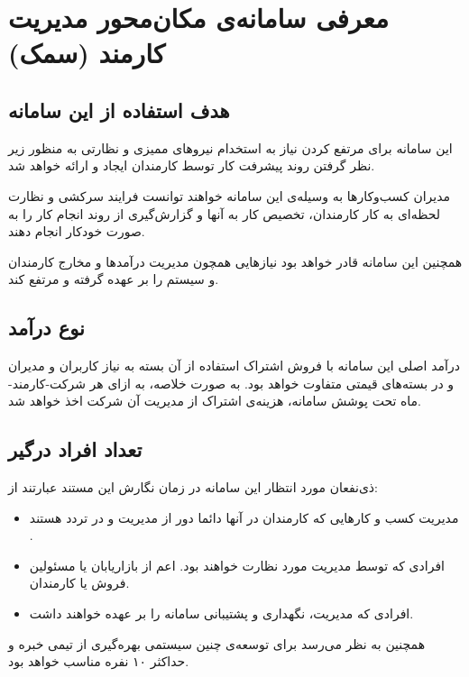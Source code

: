 
\section{معرفی سامانه‌ی مکان‌محور مدیریت کارمند (سمک)}

\subsection{هدف استفاده از این سامانه}
این سامانه برای مرتفع کردن نیاز به استخدام نیرو‌های ممیزی و نظارتی به منظور زیر نظر گرفتن روند پیشرفت کار توسط کارمندان ایجاد و ارائه خواهد شد.

مدیران کسب‌وکار‌ها به وسیله‌ی این سامانه خواهند توانست فرایند سرکشی و نظارت لحظه‌ای به کار کارمندان، تخصیص کار به آنها و گزارش‌گیری از روند انجام کار را به صورت خودکار انجام دهند.

همچنین این سامانه قادر خواهد بود نیاز‌هایی همچون مدیریت درآمد‌ها و مخارج کارمندان و سیستم را بر عهده گرفته و مرتفع کند.

\subsection{نوع در‌آمد}
درآمد اصلی این سامانه با فروش اشتراک استفاده از آن بسته به نیاز‌ کاربران و مدیران و در بسته‌های قیمتی متفاوت خواهد بود. به صورت خلاصه، به ازای هر شرکت-کارمند-ماه تحت پوشش سامانه، هزینه‌ی اشتراک از مدیریت آن شرکت اخذ خواهد شد.

\subsection{تعداد افراد درگیر}
ذی‌نفعان مورد انتظار این سامانه در زمان نگارش این مستند عبارتند از:

\begin{itemize}
\item 
مدیریت کسب و کار‌هایی که کارمندان در آنها دائما دور از مدیریت و در تردد هستند .
\item
افرادی که توسط مدیریت مورد نظارت خواهند بود. اعم از بازاریابان یا مسئولین فروش یا کارمندان.
\item
افرادی که مدیریت، نگهداری و پشتیبانی سامانه را بر عهده خواهند داشت.
\end{itemize}

همچنین به نظر می‌رسد برای توسعه‌ی چنین سیستمی بهره‌گیری از تیمی خبره و حداکثر ۱۰ نفره مناسب خواهد بود.

